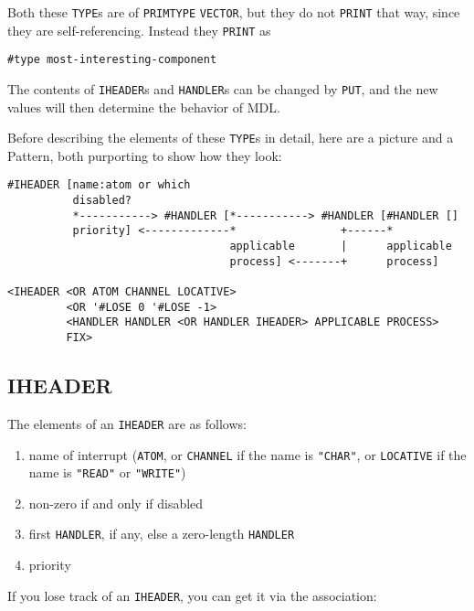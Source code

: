 \documentclass[a4paper]{scrbook}
\providecommand{\tightlist}{%
  \setlength{\itemsep}{0pt}\setlength{\parskip}{0pt}}
\begin{document}
Both these \texttt{TYPE}s are of \texttt{PRIMTYPE} \texttt{VECTOR}, but they do not \texttt{PRINT} that way, since they are
self-referencing. Instead they \texttt{PRINT} as

\begin{verbatim}
#type most-interesting-component
\end{verbatim}

The contents of \texttt{IHEADER}s and \texttt{HANDLER}s can
be changed by \texttt{PUT}, and the new values will then determine the behavior of MDL.

Before describing the elements of these \texttt{TYPE}s in detail, here are a picture and a Pattern, both purporting to show
how they look:

\begin{verbatim}
#IHEADER [name:atom or which
          disabled?
          *-----------> #HANDLER [*-----------> #HANDLER [#HANDLER []
          priority] <-------------*                +------*
                                  applicable       |      applicable
                                  process] <-------+      process]

<IHEADER <OR ATOM CHANNEL LOCATIVE>
         <OR '#LOSE 0 '#LOSE -1>
         <HANDLER HANDLER <OR HANDLER IHEADER> APPLICABLE PROCESS>
         FIX>
\end{verbatim}

\subsection{IHEADER}\label{iheader}

The elements of an \texttt{IHEADER} are as follows:

\begin{enumerate}
\def\labelenumi{\arabic{enumi}.}
\tightlist
\item
  name of interrupt (\texttt{ATOM}, or \texttt{CHANNEL} if the name is \texttt{"CHAR"}, or \texttt{LOCATIVE} if the name is
  \texttt{"READ"} or \texttt{"WRITE"})
\item
  non-zero if and only if disabled
\item
  first \texttt{HANDLER}, if any, else a zero-length \texttt{HANDLER}
\item
  priority
\end{enumerate}

If you lose track of an \texttt{IHEADER}, you can get it via the association:
\end{document}
